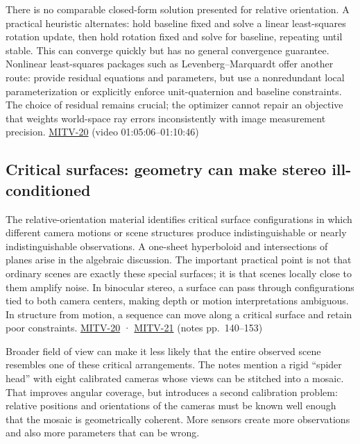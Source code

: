 There is no comparable closed-form solution presented for relative orientation. A practical heuristic alternates: hold baseline fixed and solve a linear least-squares rotation update, then hold rotation fixed and solve for baseline, repeating until stable. This can converge quickly but has no general convergence guarantee. Nonlinear least-squares packages such as Levenberg--Marquardt offer another route: provide residual equations and parameters, but use a nonredundant local parameterization or explicitly enforce unit-quaternion and baseline constraints. The choice of residual remains crucial; the optimizer cannot repair an objective that weights world-space ray errors inconsistently with image measurement precision. \hyperref[04-visual-computing-ii-ch036-mitv-20---space-of-rotations-regular-tessellations-critical-surfaces-binocular-stereo]{MITV-20} (video 01:05:06--01:10:46)

\subsection{Critical surfaces: geometry can make stereo ill-conditioned}\label{04-visual-computing-ii-ch032-critical-surfaces-geometry-can-make-stereo-ill-conditioned}

\hypertarget{04-visual-computing-ii-ch032-critical-surfaces-geometry-can-make-stereo-ill-conditioned}{}

The relative-orientation material identifies critical surface configurations in which different camera motions or scene structures produce indistinguishable or nearly indistinguishable observations. A one-sheet hyperboloid and intersections of planes arise in the algebraic discussion. The important practical point is not that ordinary scenes are exactly these special surfaces; it is that scenes locally close to them amplify noise. In binocular stereo, a surface can pass through configurations tied to both camera centers, making depth or motion interpretations ambiguous. In structure from motion, a sequence can move along a critical surface and retain poor constraints. \hyperref[04-visual-computing-ii-ch036-mitv-20---space-of-rotations-regular-tessellations-critical-surfaces-binocular-stereo]{MITV-20} · \hyperref[04-visual-computing-ii-ch036-mitv-21---relative-orientation-binocular-stereo-structure-quadrics-calibration-reprojection]{MITV-21} (notes pp.~140--153)

Broader field of view can make it less likely that the entire observed scene resembles one of these critical arrangements. The notes mention a rigid ``spider head'' with eight calibrated cameras whose views can be stitched into a mosaic. That improves angular coverage, but introduces a second calibration problem: relative positions and orientations of the cameras must be known well enough that the mosaic is geometrically coherent. More sensors create more observations and also more parameters that can be wrong.

